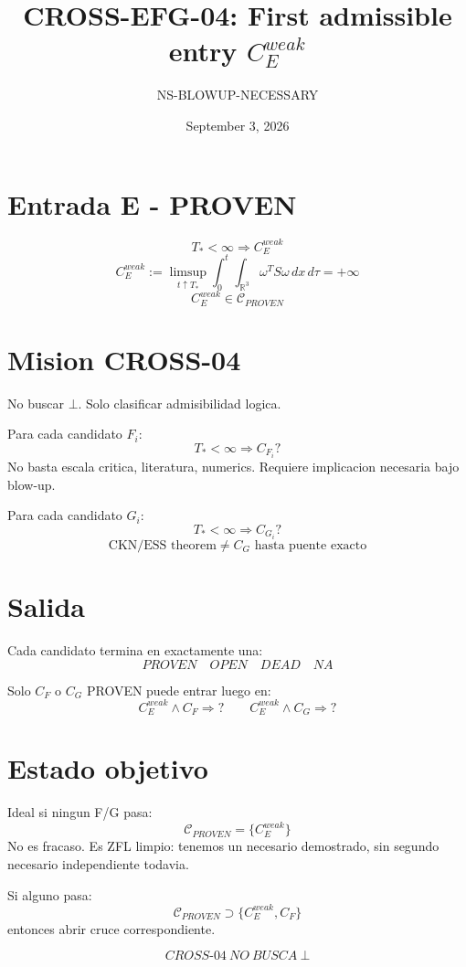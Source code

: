 \documentclass[11pt]{article}
\title{CROSS-EFG-04: First admissible entry $C_E^{weak}$}
\author{NS-BLOWUP-NECESSARY}
\date{September 3, 2026}
\begin{document}
\maketitle

\section*{Entrada E - PROVEN}
\[
\boxed{
T_*<\infty\Rightarrow C_E^{weak}
}
\]
\[
C_E^{weak}:= \limsup_{t\uparrow T_*}\int_0^t\int_{\mathbb R^3}\omega^T S\omega\,dx\,d\tau=+\infty
\]
\[
\boxed{C_E^{weak}\in\mathcal C_{PROVEN}}
\]

\section*{Mision CROSS-04}
No buscar $\bot$. Solo clasificar admisibilidad logica.

Para cada candidato $F_i$:
\[
\boxed{T_*<\infty\Rightarrow C_{F_i}?}
\]
No basta escala critica, literatura, numerics. Requiere implicacion necesaria bajo blow-up.

Para cada candidato $G_i$:
\[
\boxed{T_*<\infty\Rightarrow C_{G_i}?}
\]
\[
\boxed{\text{CKN/ESS theorem}\neq C_G\text{ hasta puente exacto}}
\]

\section*{Salida}
Cada candidato termina en exactamente una:
\[
\boxed{PROVEN}\quad\boxed{OPEN}\quad\boxed{DEAD}\quad\boxed{NA}
\]

Solo $C_F$ o $C_G$ PROVEN puede entrar luego en:
\[
C_E^{weak}\land C_F\Rightarrow?\qquad C_E^{weak}\land C_G\Rightarrow?
\]

\section*{Estado objetivo}
Ideal si ningun F/G pasa:
\[
\boxed{\mathcal C_{PROVEN}=\{C_E^{weak}\}}
\]
No es fracaso. Es ZFL limpio: tenemos un necesario demostrado, sin segundo necesario independiente todavia.

Si alguno pasa:
\[
\boxed{\mathcal C_{PROVEN}\supset\{C_E^{weak},C_F\}}
\]
entonces abrir cruce correspondiente.

\[
\boxed{CROSS\text{-}04\ NO\ BUSCA\ \bot}
\]
\end{document}
